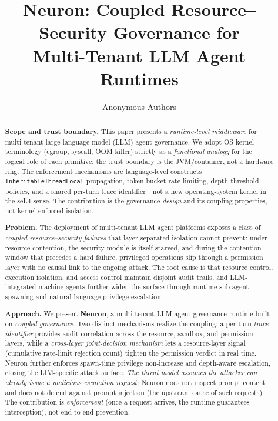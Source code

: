\documentclass[10pt,letterpaper]{article}
\title{Neuron: Coupled Resource--Security Governance for\\Multi-Tenant LLM Agent Runtimes}
\author{Anonymous Authors}
\date{}
\begin{document}
\maketitle

\begin{abstract}
\textbf{Scope and trust boundary.} This paper presents a \emph{runtime-level
middleware} for multi-tenant large language model (LLM) agent governance.
We adopt OS-kernel terminology (cgroup, syscall, OOM killer) strictly as a
\emph{functional analogy} for the logical role of each primitive; the
trust boundary is the JVM/container, not a hardware ring. The enforcement
mechanisms are language-level constructs---\texttt{InheritableThreadLocal}
propagation, token-bucket rate limiting, depth-threshold policies, and a
shared per-turn trace identifier---not a new operating-system kernel in
the seL4 sense. The contribution is the governance \emph{design} and its
coupling properties, not kernel-enforced isolation.

\textbf{Problem.} The deployment of multi-tenant LLM agent platforms
exposes a class of \emph{coupled resource--security failures} that
layer-separated isolation cannot prevent: under resource contention, the
security module is itself starved, and during the contention window that
precedes a hard failure, privileged operations slip through a permission
layer with no causal link to the ongoing attack. The root cause is that
resource control, execution isolation, and access control maintain
disjoint audit trails, and LLM-integrated machine agents further widen
the surface through runtime sub-agent spawning and natural-language
privilege escalation.

\textbf{Approach.} We present \textbf{Neuron}, a multi-tenant LLM agent
governance runtime built on \emph{coupled governance}. Two distinct
mechanisms realize the coupling: a per-turn \emph{trace identifier}
provides audit correlation across the resource, sandbox, and permission
layers, while a \emph{cross-layer joint-decision mechanism} lets a
resource-layer signal (cumulative rate-limit rejection count) tighten
the permission verdict in real time. Neuron further enforces
spawn-time privilege non-increase and depth-aware escalation, closing
the LIM-specific attack surface. \emph{The threat model assumes the
attacker can already issue a malicious escalation request;} Neuron does
not inspect prompt content and does not defend against prompt injection
(the upstream cause of such requests). The contribution is
\emph{enforcement} (once a request arrives, the runtime guarantees
interception), not end-to-end prevention.


\end{abstract}
\end{document}
